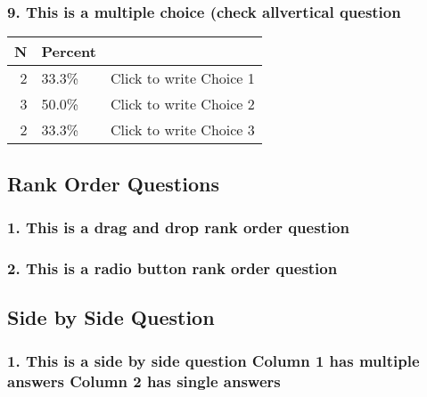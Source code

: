\documentclass{article}\usepackage[]{graphicx}\usepackage[]{color}
\begin{document}
\hfill \break \hfill \break
\subsubsection*{9.
This is a multiple choice (check allvertical question}

\begin{tabular}{r|l|l}
\hline
N & Percent & \\
\hline
2 & 33.3\% & Click to write Choice 1\\
\hline
3 & 50.0\% & Click to write Choice 2\\
\hline
2 & 33.3\% & Click to write Choice 3\\
\hline
\end{tabular}


\hfill \break \hfill \break
\subsection*{Rank Order Questions}
\subsubsection*{1.
This is a drag and drop rank order question}

\hfill \break \hfill \break
\subsubsection*{2.
This is a radio button rank order question}

\hfill \break \hfill \break
\subsection*{Side by Side Question}
\subsubsection*{1.
This is a side by side question Column 1 has multiple answers Column 2 has single answers}

\hfill \break \hfill \break
\end{document}
